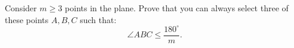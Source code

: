 Consider $m\geq 3$ points in the plane. Prove that you can always select three
of these points $A,B,C$ such that:
$$\angle ABC \leq \frac{180^{\circ}}{m}.$$